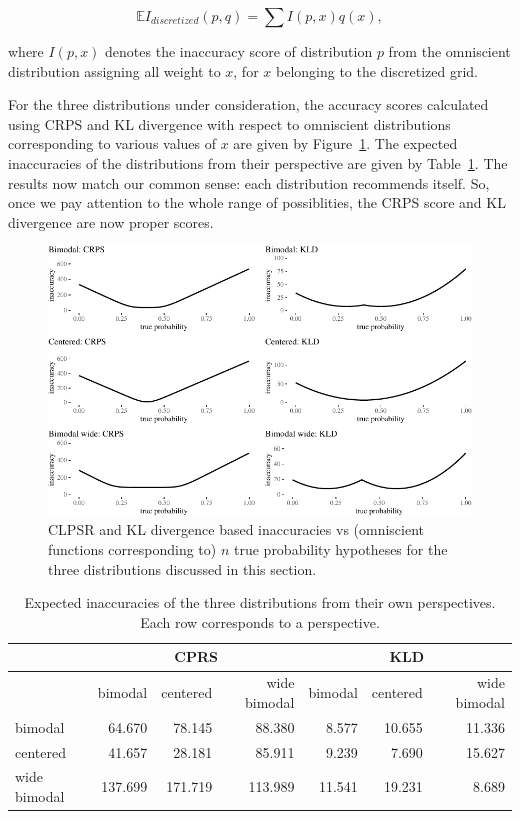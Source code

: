 \documentclass[
  letterpaper,
  DIV=11,
  numbers=noendperiod]{scrartcl}
\begin{document}
\[\mathbb{E}I_{discretized}(p,q) = \sum  I(p,x) q(x),\]

\noindent where \(I(p,x)\) denotes the inaccuracy score of distribution
\(p\) from the omniscient distribution assigning all weight to \(x\),
for \(x\) belonging to the discretized grid.

For the three distributions under consideration, the accuracy scores
calculated using CRPS and KL divergence with respect to omniscient
distributions corresponding to various values of \(x\) are given by
Figure~\ref{fig-inaccuracies2}. The expected inaccuracies of the
distributions from their perspective are given by
\mbox{Table \ref{tbl:expected2}.} The results now match our common
sense: each distribution recommends itself. So, once we pay attention to
the whole range of possiblities, the CRPS score and KL divergence are
now proper scores.

\begin{figure}[H]

{\centering \includegraphics[width=1\textwidth,height=\textheight]{imp_philosophical_backup_files/figure-pdf/fig-inaccuracies2-1.pdf}

}

\caption{\label{fig-inaccuracies2}CLPSR and KL divergence based
inaccuracies vs (omniscient functions corresponding to) \(n\) true
probability hypotheses for the three distributions discussed in this
section.}

\end{figure}

\begin{table}[H]
\begin{tabular}{lrrrrrr}
& \multicolumn{3}{c}{CPRS} & \multicolumn{3}{c}{KLD} \\
\toprule
  & bimodal & centered & wide bimodal & bimodal & centered & wide bimodal\\
\midrule
bimodal & 64.670 & 78.145 & 88.380 & 8.577 & 10.655 & 11.336\\
centered & 41.657 & 28.181 & 85.911 & 9.239 & 7.690 & 15.627\\
wide bimodal & 137.699 & 171.719 & 113.989 & 11.541 & 19.231 & 8.689\\
\bottomrule
\end{tabular}
\caption{Expected inaccuracies of the three distributions from their own perspectives.
 Each row corresponds to a perspective.}
\label{tbl:expected2}
\end{table}
\end{document}
